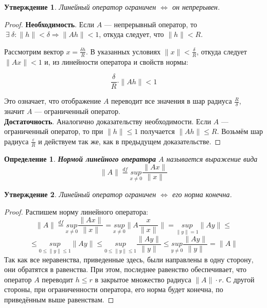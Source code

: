 \documentclass[12pt]{article}
\let\existstemp\exists
\renewcommand{\exists}{\: \existstemp \:}
\newcommand{\equals}{\Leftrightarrow}
\newcommand{\norm}[1]{\| #1 \|}
\renewcommand{\leq}{\leqslant}
\newtheorem{defi}{Определение}[section]
\newtheorem{state}{Утверждение}[section] %
\begin{document}
	\begin{state}
		Линейный оператор ограничен $\equals$ он непрерывен.
	\end{state}
	\begin{proof}
		\textbf{Необходимость}. Если $A$ --- непрерывный оператор, то 
		$ \exists \delta : \norm{h} < \delta \Rightarrow \norm{Ah} < 1 $,
		откуда следует, что $\norm{h} < R$. 
		
		Рассмотрим вектор $x = \frac{\delta h}{R}$. В указанных условиях
		$\norm{x} < \frac{\delta}{R}$, откуда следует $\norm{Ax} < 1$ и, из линейности оператора и свойств нормы:

		$$\frac{\delta}{R} \cdot \norm {Ah} < 1$$
		
		Это означает, что отображение $A$ переводит все значения в шар радиуса $\frac{R}{\delta}$, значит
		$A$ --- ограниченный оператор. \\
		
		\textbf{Достаточность}. Аналогично доказательству необходимости. Если $A$ --- ограниченный оператор,
		то при $\norm{h} \leq 1$ получается $\norm{Ah} \leq R$. Возьмём шар радиуса $\frac{\varepsilon}{R}$
		и действуем так же, как в предыдущем доказательстве.
	\end{proof}
	
	\begin{defi}
		\textbf{Нормой линейного оператора} $A$ называется выражение вида 
		$$\norm{A} \overset{df}{=} \underset{x \neq 0}{sup} \frac{\norm{Ax}}{\norm{x}}$$
	\end{defi}
	
	\begin{state}
		Линейный оператор ограничен $\equals$ его норма конечна.
	\end{state}
	\begin{proof}
		Распишем норму линейного оператора:
		$$
			\norm{A} \overset{df}{=} \underset{x \neq 0}{sup} \frac{\norm{Ax}}{\norm{x}} = 
			\underset{x \neq 0}{sup} \norm{A \frac{x}{\norm{x}}} =
			\underset{\norm{y} = 1}{sup} \norm{Ay} \leq
		$$
		$$
			\leq
			\underset{0 \leq \norm{y} \leq 1}{sup} \norm{Ay} \leq
			\underset{0 \leq \norm{y} \leq 1}{sup} \frac{\norm{Ay}}{\norm{y}} \leq
			\underset{y \neq 0}{sup} \frac{\norm{Ay}}{\norm{y}} =
			\norm{A}
		$$
		Так как все неравенства, приведенные здесь, были направлены в одну сторону,
		они обратятся в равенства. При этом, последнее равенство обеспечивает, что
		оператор $A$ переводит $h \leq r$ в закрытое множество радиуса $\norm{A} \cdot r$.
		С другой стороны, при ограниченности оператора, его норма будет конечна, по приведённым
		выше равенствам.
	\end{proof}
\end{document}
